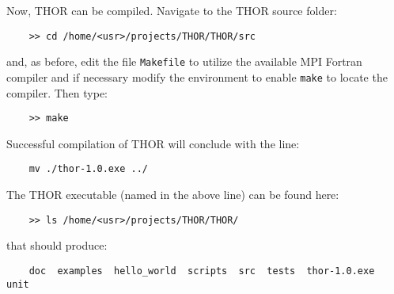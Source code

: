 Now, THOR can be compiled. Navigate to the THOR source folder:
\begin{verbatim}
    >> cd /home/<usr>/projects/THOR/THOR/src
\end{verbatim}
and, as before, edit the file \verb"Makefile" to utilize the available MPI Fortran compiler and if necessary modify the environment to enable \verb"make" to locate the compiler. Then type:
\begin{verbatim}
    >> make
\end{verbatim}
Successful compilation of THOR will conclude with the line:
\begin{verbatim}
    mv ./thor-1.0.exe ../
\end{verbatim}
The THOR executable (named in the above line) can be found here:
\begin{verbatim}
    >> ls /home/<usr>/projects/THOR/THOR/
\end{verbatim}
that should produce:
\begin{verbatim}
    doc  examples  hello_world  scripts  src  tests  thor-1.0.exe  unit
\end{verbatim}

